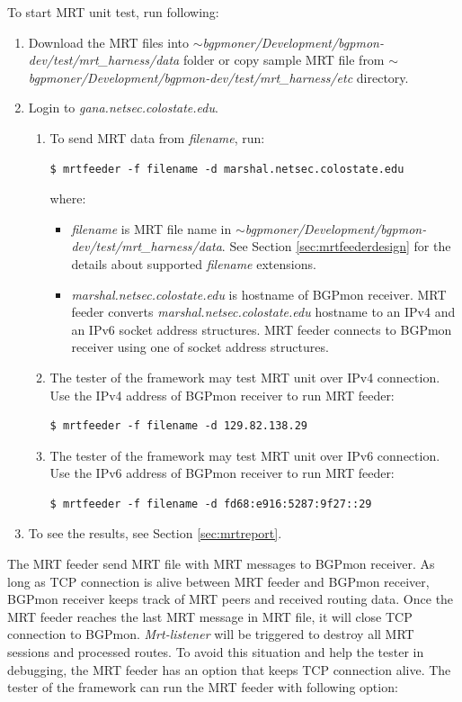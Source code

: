 To start MRT unit test, run following: 

\begin{enumerate}
  \item{Download the MRT files into \emph{$\sim$bgpmoner/Development/bgpmon-dev/test/mrt\_harness/data} folder or copy sample MRT file from \emph{$\sim$bgpmoner/Development/bgpmon-dev/test/mrt\_harness/etc} directory. }
  
  \item{Login to \emph{gana.netsec.colostate.edu}.}
  \begin{enumerate}
  \item{To send MRT data from \emph{filename},  run:}
\begin{verbatim}
$ mrtfeeder -f filename -d marshal.netsec.colostate.edu
\end{verbatim}
   where:
  \begin{itemize}
  \item{\emph{filename} is MRT file name in \emph{$\sim$bgpmoner/Development/bgpmon-dev/test/mrt\_harness/data}. See Section \ref{sec:mrtfeederdesign} for the details about supported \emph{filename} extensions. } 
  \item{\emph{marshal.netsec.colostate.edu} is hostname of  BGPmon receiver. MRT feeder converts
\emph{marshal.netsec.colostate.edu} hostname to an IPv4 and an IPv6 socket address structures. MRT feeder connects to BGPmon receiver using one of socket address structures. }
  \end{itemize}  
  \item{The tester of the framework may test MRT unit over IPv4 connection. Use the IPv4 address of BGPmon receiver to run MRT feeder:   }
\begin{verbatim}
$ mrtfeeder -f filename -d 129.82.138.29
\end{verbatim} 
  \item{The tester of the framework may test MRT unit over IPv6 connection. Use the IPv6 address of BGPmon receiver to run MRT feeder:}
\begin{verbatim}
$ mrtfeeder -f filename -d fd68:e916:5287:9f27::29
\end{verbatim}    
           
  \end{enumerate}
\item{To see the results, see Section \ref{sec:mrtreport}.}
\end{enumerate} 

The MRT feeder send MRT file with MRT messages  to BGPmon receiver. As long as TCP connection is alive between MRT feeder and BGPmon receiver,  BGPmon receiver  keeps track of MRT peers and received routing data.  Once the MRT feeder reaches the last MRT message in MRT file, it will close TCP connection to BGPmon.  \emph{Mrt-listener}  will be triggered to destroy all MRT sessions and processed routes. To avoid this  situation and help the tester in debugging, the MRT feeder has an option that keeps TCP connection alive. The tester of the framework can run the MRT feeder with following option:  
  
